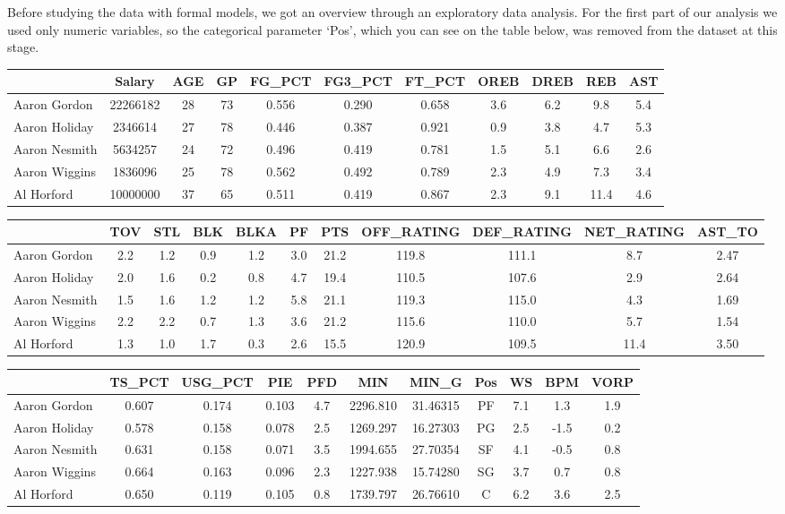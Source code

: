 \documentclass[
]{article}
\begin{document}
Before studying the data with formal models, we got an overview through
an exploratory data analysis. For the first part of our analysis we used
only numeric variables, so the categorical parameter `Pos', which you
can see on the table below, was removed from the dataset at this stage.

\begin{longtable}[]{@{}lcccccccccc@{}}
\toprule()
& Salary & AGE & GP & FG\_PCT & FG3\_PCT & FT\_PCT & OREB & DREB & REB &
AST \\
\midrule()
\endhead
Aaron Gordon & 22266182 & 28 & 73 & 0.556 & 0.290 & 0.658 & 3.6 & 6.2 &
9.8 & 5.4 \\
Aaron Holiday & 2346614 & 27 & 78 & 0.446 & 0.387 & 0.921 & 0.9 & 3.8 &
4.7 & 5.3 \\
Aaron Nesmith & 5634257 & 24 & 72 & 0.496 & 0.419 & 0.781 & 1.5 & 5.1 &
6.6 & 2.6 \\
Aaron Wiggins & 1836096 & 25 & 78 & 0.562 & 0.492 & 0.789 & 2.3 & 4.9 &
7.3 & 3.4 \\
Al Horford & 10000000 & 37 & 65 & 0.511 & 0.419 & 0.867 & 2.3 & 9.1 &
11.4 & 4.6 \\
\bottomrule()
\end{longtable}

\begin{longtable}[]{@{}lcccccccccc@{}}
\toprule()
& TOV & STL & BLK & BLKA & PF & PTS & OFF\_RATING & DEF\_RATING &
NET\_RATING & AST\_TO \\
\midrule()
\endhead
Aaron Gordon & 2.2 & 1.2 & 0.9 & 1.2 & 3.0 & 21.2 & 119.8 & 111.1 & 8.7
& 2.47 \\
Aaron Holiday & 2.0 & 1.6 & 0.2 & 0.8 & 4.7 & 19.4 & 110.5 & 107.6 & 2.9
& 2.64 \\
Aaron Nesmith & 1.5 & 1.6 & 1.2 & 1.2 & 5.8 & 21.1 & 119.3 & 115.0 & 4.3
& 1.69 \\
Aaron Wiggins & 2.2 & 2.2 & 0.7 & 1.3 & 3.6 & 21.2 & 115.6 & 110.0 & 5.7
& 1.54 \\
Al Horford & 1.3 & 1.0 & 1.7 & 0.3 & 2.6 & 15.5 & 120.9 & 109.5 & 11.4 &
3.50 \\
\bottomrule()
\end{longtable}

\begin{longtable}[]{@{}lcccccccccc@{}}
\toprule()
& TS\_PCT & USG\_PCT & PIE & PFD & MIN & MIN\_G & Pos & WS & BPM &
VORP \\
\midrule()
\endhead
Aaron Gordon & 0.607 & 0.174 & 0.103 & 4.7 & 2296.810 & 31.46315 & PF &
7.1 & 1.3 & 1.9 \\
Aaron Holiday & 0.578 & 0.158 & 0.078 & 2.5 & 1269.297 & 16.27303 & PG &
2.5 & -1.5 & 0.2 \\
Aaron Nesmith & 0.631 & 0.158 & 0.071 & 3.5 & 1994.655 & 27.70354 & SF &
4.1 & -0.5 & 0.8 \\
Aaron Wiggins & 0.664 & 0.163 & 0.096 & 2.3 & 1227.938 & 15.74280 & SG &
3.7 & 0.7 & 0.8 \\
Al Horford & 0.650 & 0.119 & 0.105 & 0.8 & 1739.797 & 26.76610 & C & 6.2
& 3.6 & 2.5 \\
\bottomrule()
\end{longtable}
\end{document}
